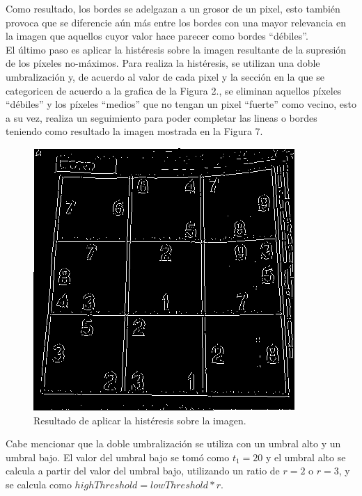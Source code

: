 \documentclass[conference]{IEEEtran}
\begin{document}
Como resultado, los bordes se adelgazan a un grosor de un pixel, esto tambi\'en provoca que se diferencie a\'un m\'as entre los bordes con una mayor relevancia en la imagen que aquellos cuyor valor hace parecer como bordes ``d\'ebiles''.\\

El \'ultimo paso es aplicar la hist\'eresis sobre la imagen resultante de la supresi\'on de los p\'ixeles no-m\'aximos. Para realiza la hist\'eresis, se utilizan una doble umbralizaci\'on y, de acuerdo al valor de cada pixel y la secci\'on en la que se categoricen de acuerdo a la grafica de la Figura 2., se eliminan aquellos p\'ixeles ``d\'ebiles'' y los p\'ixeles ``medios'' que no tengan un pixel ``fuerte'' como vecino, esto a su vez, realiza un seguimiento para poder completar las lineas o bordes teniendo como resultado la imagen mostrada en la Figura 7.

\begin{figure}[h]
	\setlength{\unitlength}{0.105in}
	\centering
	\includegraphics[scale=0.60]{./images/15sudokuHisteresis.png}
	\caption{Resultado de aplicar la hist\'eresis sobre la imagen.}
\end{figure}

\newpage
Cabe mencionar que la doble umbralizaci\'on se utiliza con un umbral alto y un umbral bajo. El valor del umbral bajo se tom\'o como $t_{1}=20$ y el umbral alto se calcula a partir del valor del umbral bajo, utilizando un ratio de $r=2$ o $r=3$, y se calcula como $highThreshold=lowThreshold*r$.\\\\
\end{document}
